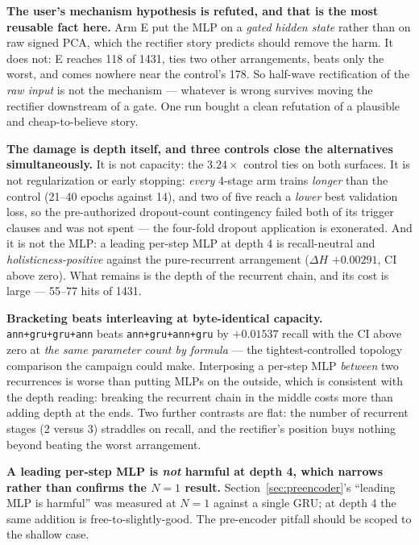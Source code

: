 \documentclass[11pt]{article}
\begin{document}
\textbf{The user's mechanism hypothesis is refuted, and that is the most reusable
fact here.} Arm E put the MLP on a \emph{gated hidden state} rather than on raw
signed PCA, which the rectifier story predicts should remove the harm. It does not:
E reaches \num{118} of \num{1431}, ties two other arrangements, beats only the
worst, and comes nowhere near the control's \num{178}. So half-wave rectification
of the \emph{raw input} is not the mechanism --- whatever is wrong survives moving
the rectifier downstream of a gate. One run bought a clean refutation of a
plausible and cheap-to-believe story.

\textbf{The damage is depth itself, and three controls close the alternatives
simultaneously.} It is not capacity: the $\num{3.24}\times$ control ties on both
surfaces. It is not regularization or early stopping: \emph{every} 4-stage arm
trains \emph{longer} than the control (\numrange{21}{40} epochs against \num{14}),
and two of five reach a \emph{lower} best validation loss, so the pre-authorized
dropout-count contingency failed both of its trigger clauses and was not spent ---
the four-fold dropout application is exonerated. And it is not the MLP: a leading
per-step MLP at depth 4 is recall-neutral and \emph{holisticness-positive} against
the pure-recurrent arrangement ($\Delta H$ $+\num{0.00291}$, CI above zero). What
remains is the depth of the recurrent chain, and its cost is large ---
\numrange{55}{77} hits of \num{1431}.

\textbf{Bracketing beats interleaving at byte-identical capacity.}
\texttt{ann+gru+gru+ann} beats \texttt{ann+gru+ann+gru} by $+\num{0.01537}$ recall
with the CI above zero at \emph{the same parameter count by formula} --- the
tightest-controlled topology comparison the campaign could make. Interposing a
per-step MLP \emph{between} two recurrences is worse than putting MLPs on the
outside, which is consistent with the depth reading: breaking the recurrent chain
in the middle costs more than adding depth at the ends. Two further contrasts are
flat: the number of recurrent stages (2 versus 3) straddles on recall, and the
rectifier's position buys nothing beyond beating the worst arrangement.

\textbf{A leading per-step MLP is \emph{not} harmful at depth 4, which narrows
rather than confirms the $N=1$ result.} Section~\ref{sec:preencoder}'s ``leading
MLP is harmful'' was measured at $N=1$ against a single GRU; at depth 4 the same
addition is free-to-slightly-good. The pre-encoder pitfall should be scoped to the
shallow case.
\end{document}
